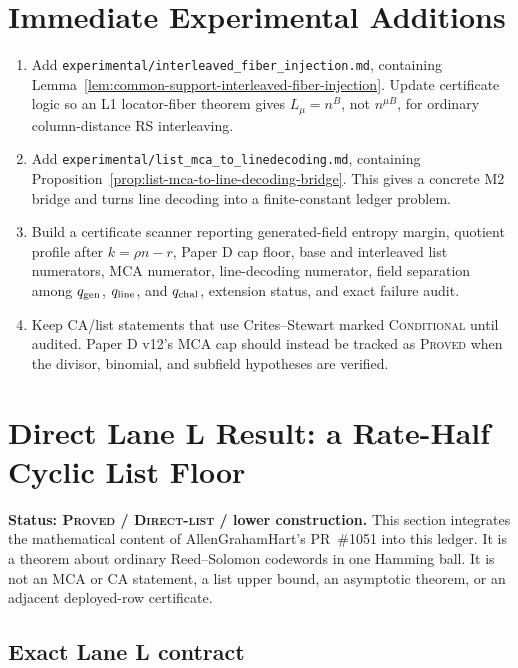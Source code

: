\documentclass[11pt]{article}
\newcommand{\qline}{q_{\rm line}}
\newcommand{\qgen}{q_{\rm gen}}
\newcommand{\qchal}{q_{\rm chal}}
\begin{document}
\section{Immediate Experimental Additions}
\label{sec:immediate-experimental-additions}

\begin{enumerate}
\item Add \texttt{experimental/interleaved\_fiber\_injection.md}, containing
Lemma~\ref{lem:common-support-interleaved-fiber-injection}.  Update certificate
logic so an L1 locator-fiber theorem gives \(L_\mu=n^B\), not \(n^{\mu B}\), for
ordinary column-distance RS interleaving.

\item Add \texttt{experimental/list\_mca\_to\_linedecoding.md}, containing
Proposition~\ref{prop:list-mca-to-line-decoding-bridge}.  This gives a concrete
M2 bridge and turns line decoding into a finite-constant ledger problem.

\item Build a certificate scanner reporting generated-field entropy margin,
quotient profile after \(k=\rho n-r\), Paper D cap floor, base and interleaved
list numerators, MCA numerator, line-decoding numerator, field separation among
\(\qgen\), \(\qline\), and \(\qchal\), extension status, and exact failure audit.

\item Keep CA/list statements that use Crites--Stewart marked
\textsc{Conditional} until audited.  Paper D v12's MCA cap should instead be
tracked as \textsc{Proved} when the divisor, binomial, and subfield hypotheses
are verified.
\end{enumerate}

\section{Direct Lane L Result: a Rate-Half Cyclic List Floor}
\label{sec:rate-half-cyclic-quotient-rotation-floor}

\textbf{Status: \textsc{Proved} / \textsc{Direct-list} / lower
construction.}
This section integrates the mathematical content of AllenGrahamHart's
PR~\#1051 into this ledger.  It is a theorem about ordinary Reed--Solomon
codewords in one Hamming ball.  It is not an MCA or CA statement, a list upper
bound, an asymptotic theorem, or an adjacent deployed-row certificate.

\subsection{Exact Lane L contract}
\end{document}
